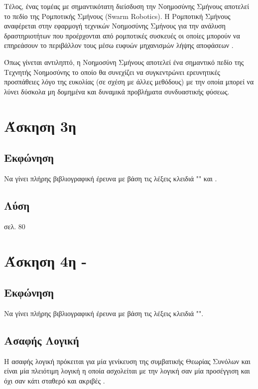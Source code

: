 \documentclass{assignment}
\begin{document}
Τέλος, ένας τομέας με σημαντικότατη διείσδυση την Νοημοσύνης Σμήνους αποτελεί
το πεδίο της Ρομποτικής Σμήνους (Swarm Robotics). Η Ρομποτική Σμήνους αναφέρεται
στην εφαρμογή τεχνικών Νοημοσύνης Σμήνους για την ανάλυση δραστηριοτήτων που
προέρχονται από ρομποτικές συσκευές οι οποίες μπορούν να επηρεάσουν το
περιβάλλον τους μέσω ευφυών μηχανισμών λήψης αποφάσεων \cite{jevtic2007swarm}.

Όπως γίνεται αντιληπτό, η Νοημοσύνη Σμήνους αποτελεί ένα σημαντικό πεδίο της
Τεχνητής Νοημοσύνης το οποίο θα συνεχίζει να συγκεντρώνει ερευνητικές
προσπάθειες λόγο της ευκολίας (σε σχέση με άλλες μεθόδους) με την οποία μπορεί
να λύνει δύσκολα μη δομημένα και δυναμικά προβλήματα συνδυαστικής φύσεως.
\section{Άσκηση 3η}
\subsection{Εκφώνηση}

Να γίνει πλήρης βιβλιογραφική έρευνα με βάση τις λέξεις κλειδιά "" και .

\subsection {Λύση}

σελ. 80

\section{Άσκηση 4η - }
\subsection{Εκφώνηση}

Να γίνει πλήρης βιβλιογραφική έρευνα με βάση τις λέξεις κλειδιά "".

\subsection {Ασαφής Λογική}

Η ασαφής λογική πρόκειται για μία γενίκευση της συμβατικής Θεωρίας Συνόλων και είναι μία πλειότιμη λογική η οποία ασχολείται με την λογική σαν μία προσέγγιση και όχι σαν κάτι σταθερό και ακριβές \cite{engelbrecht,class_notes,wiki:fuzzy_logic,zadeh1994}. %
\end{document}
